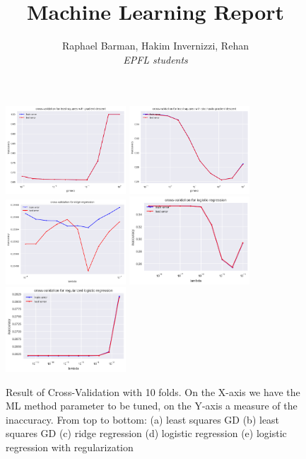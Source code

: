 \documentclass[10pt,conference,compsocconf]{IEEEtran}
\begin{document}
\title{Machine Learning Report}

\author{
  Raphael Barman, Hakim Invernizzi, Rehan \\
  \textit{EPFL students}
}

\maketitle

\begin{figure}
\begin{center}
\includegraphics[width=4.5cm]{cross_validation_least_squares_GD.png}
\includegraphics[width=4.5cm]{cross_validation_least_squares_SGD.png}
\includegraphics[width=4.5cm]{cross_validation_ridge_regression.png}
\includegraphics[width=4.5cm]{cross_validation_logistic_regression.png}
\includegraphics[width=4.5cm]{cross_validation_reg_logistic_regression.png}
 \end{center}
 \begin{center}
 \caption{\label{fig:figure1}Result of Cross-Validation with 10 folds. On the X-axis we have the ML method parameter to be tuned, on the Y-axis a measure of the inaccuracy. From top to bottom: (a) least squares GD (b) least squares GD (c) ridge regression (d) logistic regression (e) logistic regression with regularization}
 \end{center}
\end{figure}
\end{document}
